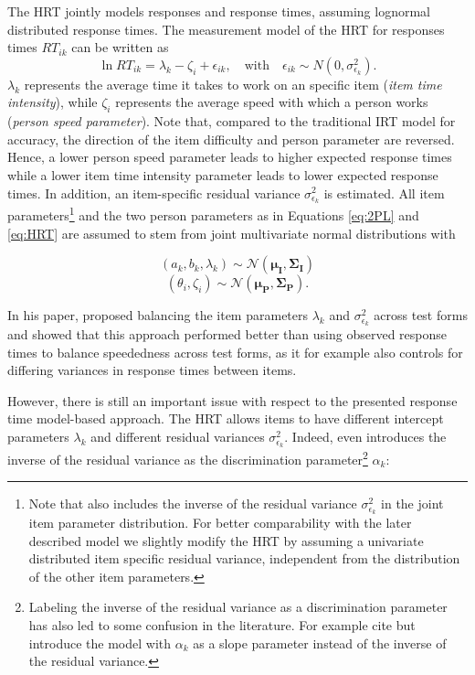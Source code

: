 \documentclass[a4paper,man,apacite,floatsintext,donotrepeattitle]{apa6}
\begin{document}
The HRT jointly models responses and response times, assuming lognormal distributed response times. The measurement model of the HRT for responses times $RT_{ik}$ can be written as 
\begin{equation}
	\ln RT_{ik} = \lambda_{k} - \zeta_{i} + \epsilon_{ik}, 
	\quad \textrm{with} \quad \epsilon_{ik} \sim N (0, \sigma^2_{\epsilon_{k}}).
	\label{eq:HRT}
\end{equation}
$\lambda_{k}$ represents the average time it takes to work on an specific item (\textit{item time intensity}), while $\zeta_{i}$ represents the average speed with which a person works (\textit{person speed parameter}). Note that, compared to the traditional IRT model for accuracy, the direction of the item difficulty and person parameter are reversed. Hence, a lower person speed parameter leads to higher expected response times while a lower item time intensity parameter leads to lower expected response times. In addition, an item-specific residual variance $\sigma^2_{\epsilon_{k}}$ is estimated. All item parameters\footnote{Note that  also includes the inverse of the residual variance $\sigma^2_{\epsilon_{k}}$ in the joint item parameter distribution. For better comparability with the later described model we slightly modify the HRT by assuming a univariate distributed item specific residual variance, independent from the distribution of the other item parameters.} and the two person parameters as in Equations \ref{eq:2PL} and \ref{eq:HRT} are assumed to stem from joint multivariate normal distributions with

\begin{equation}
	(a_{k}, b_{k}, \lambda_{k}) \sim \mathcal{N}(\bm{\mu_{I}}, \bm{\Sigma_{I}})
	\label{eq:HRT_ItemMVN}
\end{equation}
\begin{equation}
	(\theta_{i}, \zeta_{i}) \sim \mathcal{N}(\bm{\mu_{P}}, \bm{\Sigma_{P}}).
	\label{eq:gHRT_PersonMVN}
\end{equation}
 
In his paper,  proposed balancing the item parameters $\lambda_{k}$ and $\sigma^2_{\epsilon_{k}}$ across test forms and showed that this approach performed better than using observed response times to balance speededness across test forms, as it for example also controls for differing variances in response times between items.

However, there is still an important issue with respect to the presented response time model-based approach. The HRT allows items to have different intercept parameters $\lambda_{k}$ and different residual variances $\sigma^2_{\epsilon_{k}}$. Indeed,  even introduces the inverse of the residual variance as the discrimination parameter\footnote{Labeling the inverse of the residual variance as a discrimination parameter has also led to some confusion in the literature. For example  cite  but introduce the model with $\alpha_k$ as a slope parameter instead of the inverse of the residual variance.} $\alpha_k$: 
\end{document}
